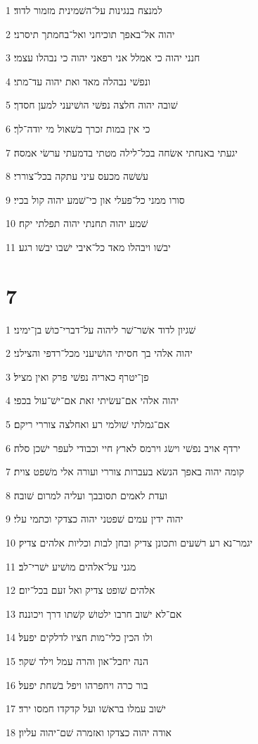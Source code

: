 \par 1 למנצח בנגינות על־השׁמינית מזמור לדוד׃
\par 2 יהוה אל־באפך תוכיחני ואל־בחמתך תיסרני׃
\par 3 חנני יהוה כי אמלל אני רפאני יהוה כי נבהלו עצמי׃
\par 4 ונפשׁי נבהלה מאד ואת יהוה עד־מתי׃
\par 5 שׁובה יהוה חלצה נפשׁי הושׁיעני למען חסדך׃
\par 6 כי אין במות זכרך בשׁאול מי יודה־לך׃
\par 7 יגעתי באנחתי אשׂחה בכל־לילה מטתי בדמעתי ערשׂי אמסה׃
\par 8 עשׁשׁה מכעס עיני עתקה בכל־צוררי׃
\par 9 סורו ממני כל־פעלי און כי־שׁמע יהוה קול בכיי׃
\par 10 שׁמע יהוה תחנתי יהוה תפלתי יקח׃
\par 11 יבשׁו ויבהלו מאד כל־איבי ישׁבו יבשׁו רגע׃

\chapter{7}

\par 1 שׁגיון לדוד אשׁר־שׁר ליהוה על־דברי־כושׁ בן־ימיני׃
\par 2 יהוה אלהי בך חסיתי הושׁיעני מכל־רדפי והצילני׃
\par 3 פן־יטרף כאריה נפשׁי פרק ואין מציל׃
\par 4 יהוה אלהי אם־עשׂיתי זאת אם־ישׁ־עול בכפי׃
\par 5 אם־גמלתי שׁולמי רע ואחלצה צוררי ריקם׃
\par 6 ירדף אויב נפשׁי וישׂג וירמס לארץ חיי וכבודי לעפר ישׁכן סלה׃
\par 7 קומה יהוה באפך הנשׂא בעברות צוררי ועורה אלי משׁפט צוית׃
\par 8 ועדת לאמים תסובבך ועליה למרום שׁובה׃
\par 9 יהוה ידין עמים שׁפטני יהוה כצדקי וכתמי עלי׃
\par 10 יגמר־נא רע רשׁעים ותכונן צדיק ובחן לבות וכליות אלהים צדיק׃
\par 11 מגני על־אלהים מושׁיע ישׁרי־לב׃
\par 12 אלהים שׁופט צדיק ואל זעם בכל־יום׃
\par 13 אם־לא ישׁוב חרבו ילטושׁ קשׁתו דרך ויכוננה׃
\par 14 ולו הכין כלי־מות חציו לדלקים יפעל׃
\par 15 הנה יחבל־און והרה עמל וילד שׁקר׃
\par 16 בור כרה ויחפרהו ויפל בשׁחת יפעל׃
\par 17 ישׁוב עמלו בראשׁו ועל קדקדו חמסו ירד׃
\par 18 אודה יהוה כצדקו ואזמרה שׁם־יהוה עליון׃

